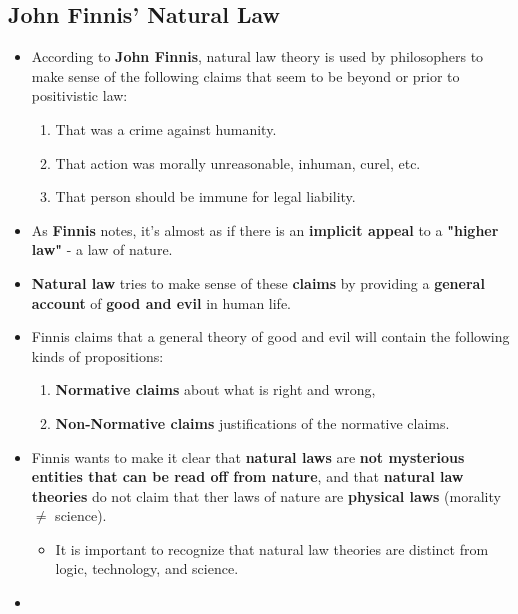 \documentclass{article}
\begin{document}
    \subsection*{John Finnis' Natural Law}
    \begin{itemize}
        \item According to \textbf{John Finnis}, natural law theory is used by philosophers to make sense of the following claims that seem to be beyond or prior to positivistic law:
        \begin{enumerate}
            \item That was a crime against humanity.
            \item That action was morally unreasonable, inhuman, curel, etc.
            \item That person should be immune for legal liability.
        \end{enumerate}
        \item As \textbf{Finnis} notes, it's almost as if there is an \textbf{implicit appeal} to a \textbf{"higher law"} - a law of nature.
        \item \textbf{Natural law} tries to make sense of these \textbf{claims} by providing a \textbf{general account} of \textbf{good and evil} in human life.
        \item Finnis claims that a general theory of good and evil will contain the following kinds of propositions:
        \begin{enumerate}
            \item \textbf{Normative claims} about what is right and wrong,
            \item \textbf{Non-Normative claims} justifications of the normative claims. 
        \end{enumerate}
        \item Finnis wants to make it clear that \textbf{natural laws} are \textbf{not mysterious entities that can be read off from nature}, and that \textbf{natural law theories} do not claim that ther laws of nature are \textbf{physical laws} (morality $\ne$ science).
        \begin{itemize}
            \item It is important to recognize that natural law theories are distinct from logic, technology, and science.
        \end{itemize}
        \item 
    \end{itemize}
\end{document}

